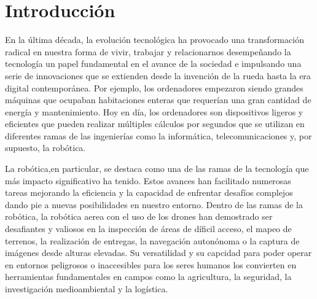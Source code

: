 \chapter{Introducción}
\label{cap:introduccion}
\setcounter{page}{1}

En la última década, la evolución tecnológica ha provocado una transformación radical en nuestra forma de vivir, trabajar y relacionarnos desempeñando la tecnología un papel 
fundamental en el avance de la sociedad e impulsando una serie de innovaciones que se extienden desde la invención de la rueda hasta la era digital contemporánea. 
Por ejemplo, los ordenadores empezaron siendo grandes máquinas que ocupaban habitaciones enteras que requerían una gran cantidad de energía y mantenimiento. Hoy en día, los ordenadores
son dispositivos ligeros y eficientes que pueden realizar múltiples cálculos por segundos que se utilizan en diferentes ramas de las ingenierías como la informática, telecomunicaciones y,
por supuesto, la robótica. \newline

La robótica,en particular, se destaca como una de las ramas de la tecnología que más impacto significativo ha tenido. Estos avances han facilitado numerosas tareas mejorando la eficiencia 
y la capacidad de enfrentar desafíos complejos dando pie a nuevas posibilidades en nuestro entorno. Dentro de las ramas de la robótica, la robótica aerea con el uso de los drones han 
demostrado ser desafiantes y valiosos en la inspección de áreas de díficil acceso, el mapeo de terrenos, la realización de entregas, la navegación autonónoma o la captura 
de imágenes desde alturas elevadas. Su versatilidad y su capcidad para poder operar en entornos peligrosos o inaccesibles para los seres humanos los convierten 
en herramientas fundamentales en campos como la agricultura, la seguridad, la investigación medioambiental y la logística. 

